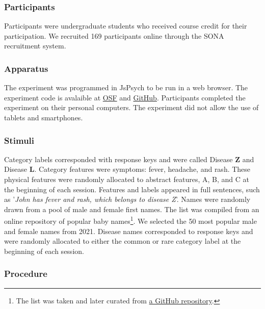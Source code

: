 \documentclass[10pt,letterpaper]{article}
\begin{document}
\subsubsection*{Participants}

Participants were undergraduate students who received course credit for their participation.
We recruited 169 participants online through the SONA recruitment system.

\subsubsection*{Apparatus}

The experiment was programmed in JsPsych \cite{deleeuw2015JsPsych} to be run in a web browser.
The experiment code is avalaible at \href{https://osf.io/auwvt/?view_only=2dc8384074fa4bcf9f2e3937fdaee2b4}{OSF} and \href{https://github.com/lenarddome/ply216-observational-ibre}{GitHub}.
Participants completed the experiment on their personal computers.
The experiment did not allow the use of tablets and smartphones.

\subsubsection*{Stimuli}

Category labels corresponded with response keys and were called Disease \textbf{Z} and Disease \textbf{L}.
Category features were symptoms: fever, headache, and rash.
These physical features were randomly allocated to abstract features, A, B, and C at the beginning of each session.
Features and labels appeared in full sentences, such as '\textit{John has fever and rash, which belongs to disease Z}'.
Names were randomly drawn from a pool of male and female first names.
The list was compiled from an online repository of popular baby names\footnote[1]{The list was taken and later curated from \href{https://github.com/aruljohn/popular-baby-names}{a GitHub repository}.}.
We selected the 50 most popular male and female names from 2021.
Disease names corresponded to response keys and were randomly allocated to either the common or rare category label at the beginning of each session.

\subsubsection*{Procedure}
\end{document}
